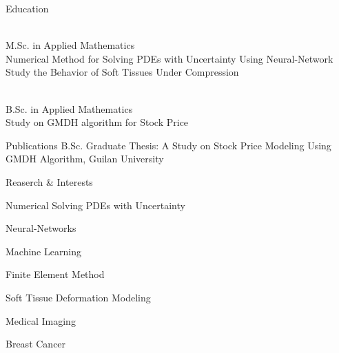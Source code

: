 \documentclass{resume} %
\begin{document}


\begin{rSection}{Education}

	 \\%
	M.Sc. in Applied Mathematics \smallskip \\
	Numerical Method for Solving PDEs with Uncertainty Using Neural-Network \\
	Study the Behavior of Soft Tissues Under Compression
	
	
	\\ %
	B.Sc. in Applied Mathematics \smallskip \\
	Study on GMDH algorithm for Stock Price
\end{rSection}

\begin{rSection}{Publications}
	 B.Sc. Graduate Thesis: A Study on Stock Price Modeling Using GMDH Algorithm, Guilan University\\	
\end{rSection}


\begin{rSection}{Reaserch \& Interests}
	
	\begin{rSubsection}{}{}{}{}
		\item Numerical Solving PDEs with Uncertainty
		\item Neural-Networks
		\item Machine Learning
		\item Finite Element Method
		\item Soft Tissue Deformation Modeling
		\item Medical Imaging
		\item Breast Cancer
	\end{rSubsection}
	
	
\end{rSection}
\end{document}
